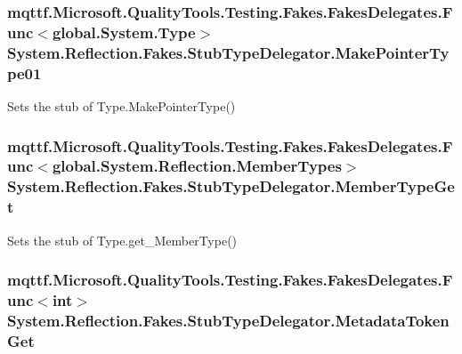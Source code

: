\hypertarget{class_system_1_1_reflection_1_1_fakes_1_1_stub_type_delegator_a78cf6a03bacc7f7765364835b3111499}{
\subsubsection[{Make\-Pointer\-Type01}]{\setlength{\rightskip}{0pt plus 5cm}mqttf.\-Microsoft.\-Quality\-Tools.\-Testing.\-Fakes.\-Fakes\-Delegates.\-Func$<$global.\-System.\-Type$>$ System.\-Reflection.\-Fakes.\-Stub\-Type\-Delegator.\-Make\-Pointer\-Type01}}\label{class_system_1_1_reflection_1_1_fakes_1_1_stub_type_delegator_a78cf6a03bacc7f7765364835b3111499}


Sets the stub of Type.\-Make\-Pointer\-Type()

\hypertarget{class_system_1_1_reflection_1_1_fakes_1_1_stub_type_delegator_a7b0e57ef3800040c4ba69b768a48a92b}{
\subsubsection[{Member\-Type\-Get}]{\setlength{\rightskip}{0pt plus 5cm}mqttf.\-Microsoft.\-Quality\-Tools.\-Testing.\-Fakes.\-Fakes\-Delegates.\-Func$<$global.\-System.\-Reflection.\-Member\-Types$>$ System.\-Reflection.\-Fakes.\-Stub\-Type\-Delegator.\-Member\-Type\-Get}}\label{class_system_1_1_reflection_1_1_fakes_1_1_stub_type_delegator_a7b0e57ef3800040c4ba69b768a48a92b}


Sets the stub of Type.\-get\-\_\-\-Member\-Type()

\hypertarget{class_system_1_1_reflection_1_1_fakes_1_1_stub_type_delegator_a9368c4da5df5d1d865b46facf9a18ff8}{
\subsubsection[{Metadata\-Token\-Get}]{\setlength{\rightskip}{0pt plus 5cm}mqttf.\-Microsoft.\-Quality\-Tools.\-Testing.\-Fakes.\-Fakes\-Delegates.\-Func$<$int$>$ System.\-Reflection.\-Fakes.\-Stub\-Type\-Delegator.\-Metadata\-Token\-Get}}\label{class_system_1_1_reflection_1_1_fakes_1_1_stub_type_delegator_a9368c4da5df5d1d865b46facf9a18ff8}


